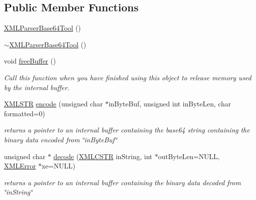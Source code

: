 \subsection*{Public Member Functions}
\begin{DoxyCompactItemize}
\item 
\hyperlink{structXMLParserBase64Tool_a5e3ba8eaaa2876a336ae5e222312caf9}{X\-M\-L\-Parser\-Base64\-Tool} ()
\item 
\hyperlink{structXMLParserBase64Tool_a64195fb4e9ec2fee9c0ec7f2d15df5fd}{$\sim$\-X\-M\-L\-Parser\-Base64\-Tool} ()
\item 
void \hyperlink{structXMLParserBase64Tool_a3d9e7dcbe313eef25a324b88667f4c65}{free\-Buffer} ()
\begin{DoxyCompactList}\small\item\em Call this function when you have finished using this object to release memory used by the internal buffer. \end{DoxyCompactList}\item 
\hyperlink{xmlParser_8h_a849d96105aa0c8f64b5c10d9151a3cdc}{X\-M\-L\-S\-T\-R} \hyperlink{structXMLParserBase64Tool_a9ea0281d0b3b8431c73f9db246935230}{encode} (unsigned char $\ast$in\-Byte\-Buf, unsigned int in\-Byte\-Len, char formatted=0)
\begin{DoxyCompactList}\small\item\em returns a pointer to an internal buffer containing the base64 string containing the binary data encoded from \char`\"{}in\-Byte\-Buf\char`\"{} \end{DoxyCompactList}\item 
unsigned char $\ast$ \hyperlink{structXMLParserBase64Tool_aace2e0d4ee4ef24890cfeb5c67d5a58a}{decode} (\hyperlink{xmlParser_8h_acdb0d6fd8dd596384b438d86cfb2b182}{X\-M\-L\-C\-S\-T\-R} in\-String, int $\ast$out\-Byte\-Len=N\-U\-L\-L, \hyperlink{xmlParser_8h_ac39bd07b1461aaa70afffe2d7162b4f5}{X\-M\-L\-Error} $\ast$xe=N\-U\-L\-L)
\begin{DoxyCompactList}\small\item\em returns a pointer to an internal buffer containing the binary data decoded from \char`\"{}in\-String\char`\"{} \end{DoxyCompactList}\end{DoxyCompactItemize}

